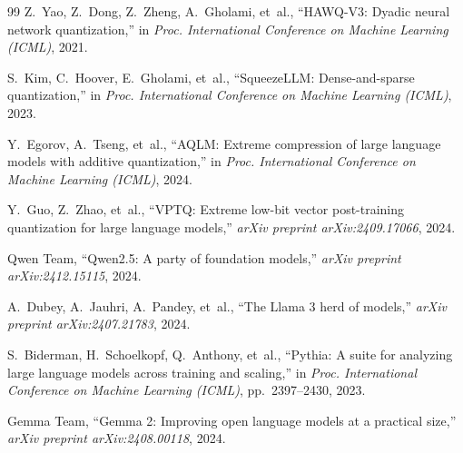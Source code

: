\documentclass[12pt,a4paper,oneside]{report}
\begin{document}
\begin{thebibliography}{99}
Z.~Yao, Z.~Dong, Z.~Zheng, A.~Gholami, et~al.,
``HAWQ-V3: Dyadic neural network quantization,''
in \textit{Proc. International Conference on Machine Learning (ICML)}, 2021.

S.~Kim, C.~Hoover, E.~Gholami, et~al.,
``SqueezeLLM: Dense-and-sparse quantization,''
in \textit{Proc. International Conference on Machine Learning (ICML)}, 2023.

Y.~Egorov, A.~Tseng, et~al.,
``AQLM: Extreme compression of large language models with additive quantization,''
in \textit{Proc. International Conference on Machine Learning (ICML)}, 2024.

Y.~Guo, Z.~Zhao, et~al.,
``VPTQ: Extreme low-bit vector post-training quantization for large language models,''
\textit{arXiv preprint arXiv:2409.17066}, 2024.

Qwen Team,
``Qwen2.5: A party of foundation models,''
\textit{arXiv preprint arXiv:2412.15115}, 2024.

A.~Dubey, A.~Jauhri, A.~Pandey, et~al.,
``The Llama 3 herd of models,''
\textit{arXiv preprint arXiv:2407.21783}, 2024.

S.~Biderman, H.~Schoelkopf, Q.~Anthony, et~al.,
``Pythia: A suite for analyzing large language models across training and scaling,''
in \textit{Proc. International Conference on Machine Learning (ICML)}, pp.~2397--2430, 2023.

Gemma Team,
``Gemma 2: Improving open language models at a practical size,''
\textit{arXiv preprint arXiv:2408.00118}, 2024.

\end{thebibliography}
\end{document}
